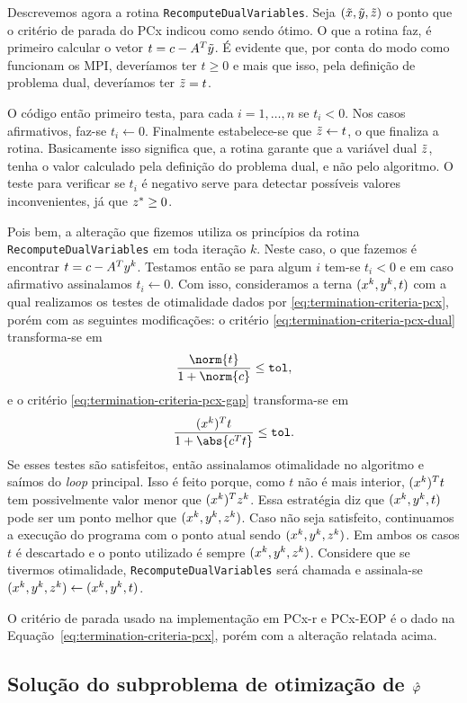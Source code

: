Descrevemos agora a rotina \verb|RecomputeDualVariables|. Seja $(\tilde{x},\tilde{y},\tilde{z})$ o ponto que o critério de parada do PCx indicou como sendo ótimo. O que a rotina faz, é primeiro calcular o vetor  $t= c - A^T\tilde{y}$. É evidente que, por conta do modo como funcionam os \ac{MPI}, deveríamos ter $t\geq0$ e mais que isso, pela definição de problema dual, deveríamos ter $\tilde{z} = t$. 

 O código então primeiro testa, para cada  $i = 1,\ldots,n$ se $t_{i}<0$.  Nos casos afirmativos, faz-se $t_{i}\leftarrow 0$. Finalmente estabelece-se que  $\tilde{z} \leftarrow t $, o que finaliza a rotina. Basicamente isso significa que, a rotina garante que a variável dual $\tilde{z}$, tenha o valor calculado pela definição do problema dual, e não pelo algoritmo. O teste para verificar se $t_{i}$ é negativo serve para detectar possíveis valores inconvenientes, já que $z^*\geq 0$.

 Pois bem, a alteração que fizemos utiliza os princípios da rotina   \verb|RecomputeDualVariables| em toda iteração $k$. Neste caso, o que fazemos é encontrar $t= c - A^Ty^{k}$. Testamos então se para algum  $i$ tem-se $t_{i}<0$ e em caso afirmativo assinalamos $t_{i}\leftarrow 0$. Com isso, consideramos a terna $(x^{k},y^{k},t)$ com a qual realizamos os testes de otimalidade dados por
 \eqref{eq:termination-criteria-pcx}, porém com as seguintes modificações: o critério \eqref{eq:termination-criteria-pcx-dual} transforma-se em
\[\dfrac{\norm{t}}{1 + \norm{c}} \leq \tol,\]	
e o critério  \eqref{eq:termination-criteria-pcx-gap} transforma-se em 
\[
	\dfrac{(\xk)^{T}t}{1 + \abs{c^Tt}}\leq\tol.
\]
Se esses testes são satisfeitos, então assinalamos otimalidade no algoritmo e saímos do \emph{loop} principal. 
Isso é feito porque,  como $t$ não é mais interior, $(x^{k})^{T}t$ tem possivelmente valor menor que $(x^{k})^{T}z^{k}$. Essa estratégia diz que $(x^{k},y^{k},t)$ pode ser um ponto melhor que $(x^{k},y^{k},z^{k})$.  Caso não seja satisfeito, continuamos a execução do programa com o ponto atual sendo $(x^{k},y^{k},z^{k})$. Em ambos os casos $t$ é descartado e o ponto utilizado é sempre $(x^{k},y^{k},z^{k})$. Considere que se tivermos otimalidade, \verb|RecomputeDualVariables| será chamada e assinala-se $(x^{k},y^{k},z^{k})\leftarrow (x^{k},y^{k},t)$. 


O critério de parada usado  na implementação em PCx-r e PCx-EOP é o dado na Equação~\eqref{eq:termination-criteria-pcx}, porém com  a alteração relatada acima. 



\subsection{Solução do subproblema de otimização \texorpdfstring{de $\hat{\varphi}$}{da função de mérito}}



